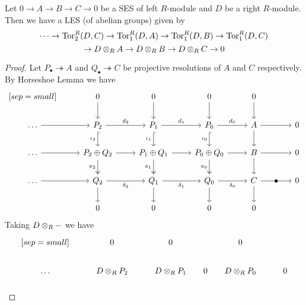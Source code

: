 \begin{thm}
    Let $0\to A\to B\to C \to 0$ be a SES of left $R$-module and $D$ be a right $R$-module. Then we have a LES (of abelian groups) given by 
    \[\dots \to \operatorname{Tor}_2^R(D,C)\to \operatorname{Tor}_1^R(D,A) \to \operatorname{Tor}_1^R(D,B)\to \operatorname{Tor}_1^R(D,C)\]
    \[\to D\otimes_R A \to D\otimes_R B\to D\otimes_R C\to 0\]
\end{thm}
\begin{proof}
    Let $P_\bullet \twoheadrightarrow A$ and $Q_\bullet \twoheadrightarrow C$ be projective resolutions of $A$ and $C$ respectively. By Horseshoe Lemma we have
    \[\begin{tikzcd}[sep=small]
	{[sep=small]} && 0 && 0 && 0 && 0 \\
	\\
	\dots && {P_2} && {P_1} && {P_0} && A && 0 \\
	\\
	\dots && {P_2 \oplus Q_2} && {P_1 \oplus Q_1} && {P_0 \oplus Q_0} && B && 0 \\
	\\
	\dots && {Q_2} && {Q_1} && {Q_0} && C & \bullet & 0 \\
	\\
	&& 0 && 0 && 0 && 0
	\arrow[from=1-3, to=3-3]
	\arrow[from=1-5, to=3-5]
	\arrow[from=1-7, to=3-7]
	\arrow[from=1-9, to=3-9]
	\arrow[from=3-1, to=3-3]
	\arrow["{{d_2}}", from=3-3, to=3-5]
	\arrow["{\iota_2}"', hook, from=3-3, to=5-3]
	\arrow["{{d_1}}", from=3-5, to=3-7]
	\arrow["{\iota_1}"', hook, from=3-5, to=5-5]
	\arrow["{{d_0}}", from=3-7, to=3-9]
	\arrow["{\iota_0}"', hook, from=3-7, to=5-7]
	\arrow[from=3-9, to=3-11]
	\arrow[from=3-9, to=5-9]
	\arrow[from=5-1, to=5-3]
	\arrow[from=5-3, to=5-5]
	\arrow["{{\pi_2}}"', two heads, from=5-3, to=7-3]
	\arrow[from=5-5, to=5-7]
	\arrow["{{\pi_1}}"', two heads, from=5-5, to=7-5]
	\arrow[from=5-7, to=5-9]
	\arrow["{{\pi_0}}"', two heads, from=5-7, to=7-7]
	\arrow[from=5-9, to=5-11]
	\arrow[from=5-9, to=7-9]
	\arrow[from=7-1, to=7-3]
	\arrow["{{\delta_2}}"', from=7-3, to=7-5]
	\arrow[from=7-3, to=9-3]
	\arrow["{{\delta_1}}"', from=7-5, to=7-7]
	\arrow[from=7-5, to=9-5]
	\arrow["{{\delta_0}}"', from=7-7, to=7-9]
	\arrow[from=7-7, to=9-7]
	\arrow[from=7-9, to=7-11]
	\arrow[from=7-9, to=9-9]
    \end{tikzcd}\]
    Taking $D\otimes_R -$ we have
    \[\begin{tikzcd}[sep=small]
	{[sep=small]} && 0 && 0 && 0 \\
	\\
	\dots && {D \ten_R P_2} && {D \ten_R P_1} & 0 & {D \ten_R P_0} && 0 \\

\end{tikzcd}\]
\end{proof}
